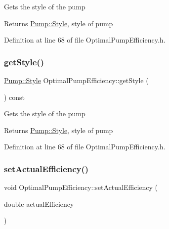 Gets the style of the pump

\begin{DoxyReturn}{Returns}
\hyperlink{class_pump_aef354601ce4218258cc898b35a1e90ff}{Pump\+::\+Style}, style of pump 
\end{DoxyReturn}


Definition at line 68 of file Optimal\+Pump\+Efficiency.\+h.

\mbox{\label{class_optimal_pump_efficiency_a601fe15e9acc23112743fabe417030fb}} 
\subsubsection{\texorpdfstring{get\+Style()}{getStyle()}\hspace{0.1cm}{\footnotesize\ttfamily [3/3]}}
{\footnotesize\ttfamily \hyperlink{class_pump_aef354601ce4218258cc898b35a1e90ff}{Pump\+::\+Style} Optimal\+Pump\+Efficiency\+::get\+Style (\begin{DoxyParamCaption}{ }\end{DoxyParamCaption}) const\hspace{0.3cm}{\ttfamily [inline]}}

Gets the style of the pump

\begin{DoxyReturn}{Returns}
\hyperlink{class_pump_aef354601ce4218258cc898b35a1e90ff}{Pump\+::\+Style}, style of pump 
\end{DoxyReturn}


Definition at line 68 of file Optimal\+Pump\+Efficiency.\+h.

\mbox{\label{class_optimal_pump_efficiency_a539b20c53c7ba6a5983a60d74be4ac9e}} 
\subsubsection{\texorpdfstring{set\+Actual\+Efficiency()}{setActualEfficiency()}\hspace{0.1cm}{\footnotesize\ttfamily [1/3]}}
{\footnotesize\ttfamily void Optimal\+Pump\+Efficiency\+::set\+Actual\+Efficiency (\begin{DoxyParamCaption}\item[{double}]{actual\+Efficiency }\end{DoxyParamCaption})\hspace{0.3cm}{\ttfamily [inline]}}

